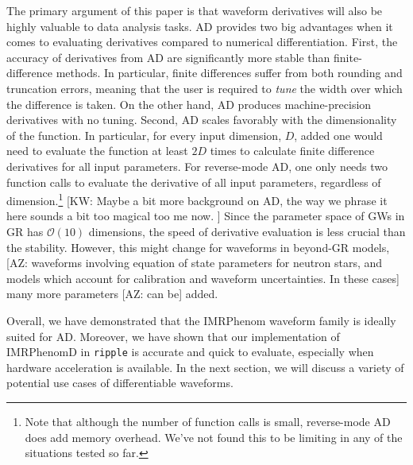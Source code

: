 \documentclass[twocolumn]{aastex631}
\newcommand{\ripple}{\texttt{ripple}\xspace}
\newcommand{\kw}[1]{{\color{rb4}[KW: #1 ]}}
\newcommand{\AZ}[1]{{\color{Burnt}[AZ: #1]}}
\begin{document}
The primary argument of this paper is that waveform derivatives will also be highly valuable to data analysis tasks. 
AD provides two big advantages when it comes to evaluating derivatives compared to numerical differentiation.
First, the accuracy of derivatives from AD are significantly more stable than finite-difference methods.
In particular, finite differences suffer from both rounding and truncation errors, meaning that the user is required to \textit{tune} the width over which the difference is taken.
On the other hand, AD produces machine-precision derivatives with no tuning.
Second, AD scales favorably with the dimensionality of the function.
In particular, for every input dimension, $D$, added one would need to evaluate the function at least $2D$ times to calculate finite difference derivatives for all input parameters.
For reverse-mode AD, one only needs two function calls to evaluate the derivative of all input parameters, regardless of dimension.\footnote{
    Note that although the number of function calls is small, reverse-mode AD does add memory overhead.
    We've not found this to be limiting in any of the situations tested so far.
}
\kw{Maybe a bit more background on AD, the way we phrase it here sounds a bit too magical too me now.}
Since the parameter space of GWs in GR has $\mathcal{O}(10)$ dimensions, the speed of derivative evaluation is less crucial than the stability.
However, this might change for waveforms in beyond-GR models, \AZ{waveforms involving equation of state parameters for neutron stars, and models which account for calibration and waveform uncertainties.
In these cases} many more parameters \AZ{can be} added.

Overall, we have demonstrated that the IMRPhenom waveform family is ideally suited for AD.
Moreover, we have shown that our implementation of IMRPhenomD in \ripple is accurate and quick to evaluate, especially when hardware acceleration is available.
In the next section, we will discuss a variety of potential use cases of differentiable waveforms.

\end{document}
